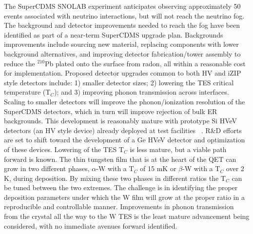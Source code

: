 The SuperCDMS SNOLAB experiment anticipates observing approximately 50 events associated with neutrino interactions, but will not reach the neutrino fog.  The background and detector improvements needed to reach the fog have been identified as part of a near-term SuperCDMS upgrade plan.  Backgrounds improvements include sourcing new material, replacing components with lower background alternatives, and improving detector fabrication/tower assembly to reduce the $^{210}$Pb plated onto the surface from radon, all within a reasonable cost for implementation.  Proposed detector upgrades common to both HV and iZIP style detectors include: 1) smaller detector sizes; 2) lowering the TES critical temperature (T$_C$); and 3) improving phonon transmission across interfaces.  Scaling to smaller detectors will improve the phonon/ionization resolution of the SuperCDMS detectors, which in turn will improve rejection of bulk ER backgrounds. This development is reasonably mature with prototype Si HVeV detectors (an HV style device) already deployed at test facilities ~\cite{SCDMS2019,SCDMS2020}.  R\&D efforts are set to shift toward the development of a Ge HVeV detector and optimization of these devices.  Lowering of the TES T$_C$ is less mature, but a viable path forward is known. The thin tungsten film that is at the heart of the QET can grow in two different phases, $\alpha$-W with a T$_C$ of 15 mK or $\beta$-W with a T$_C$ over 2 K, during deposition. By mixing these two phases in different ratios the T$_C$ can be tuned between the two extremes.  The challenge is in identifying the proper deposition parameters under which the W film will grow at the proper ratio in a reproducible and controllable manner.  Improvements in phonon transmission from the crystal all the way to the W TES is the least mature advancement being considered, with no immediate avenues forward identified.
